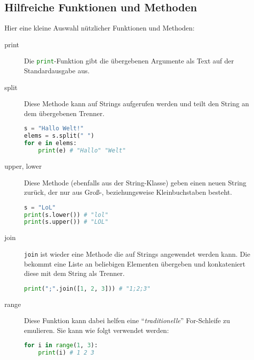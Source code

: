 \documentclass[columns=3]{cheatsheet}
\begin{document}
\begin{description}
\section{Hilfreiche Funktionen und Methoden}
Hier eine kleine Auswahl nützlicher Funktionen und Methoden:
\begin{description}
	\item[print] Die \lstinline[language=python]{print}-Funktion gibt die übergebenen Argumente als Text auf der Standardausgabe aus.
	\item[split] Diese Methode kann auf Strings aufgerufen werden und teilt den String an dem übergebenen Trenner.
		\begin{lstlisting}[language=python]
s = "Hallo Welt!"
elems = s.split(" ")
for e in elems:
	print(e) # "Hallo" "Welt"
		\end{lstlisting}
	\item[upper, lower] Diese Methode (ebenfalls aus der String-Klasse) geben einen neuen String zurück, der nur aus Groß-, beziehungsweise
		Kleinbuchstaben besteht.
		\begin{lstlisting}[language=python]
s = "LoL"
print(s.lower()) # "lol"
print(s.upper()) # "LOL"
		\end{lstlisting}
	\item[join] \texttt{join} ist wieder eine Methode die auf Strings angewendet werden kann. Die bekommt eine Liste an beliebigen Elementen
		übergeben und konkateniert diese mit dem String als Trenner.
		\begin{lstlisting}[language=python]
print(";".join([1, 2, 3])) # "1;2;3"
		\end{lstlisting}
	\item[range] Diese Funktion kann dabei helfen eine \enquote{\textit{traditionelle}} For-Schleife zu emulieren.
		Sie kann wie folgt verwendet werden:
		\begin{lstlisting}[language=python]
for i in range(1, 3):
	print(i) # 1 2 3
		\end{lstlisting}
\end{description}



\end{description}
\end{document}

